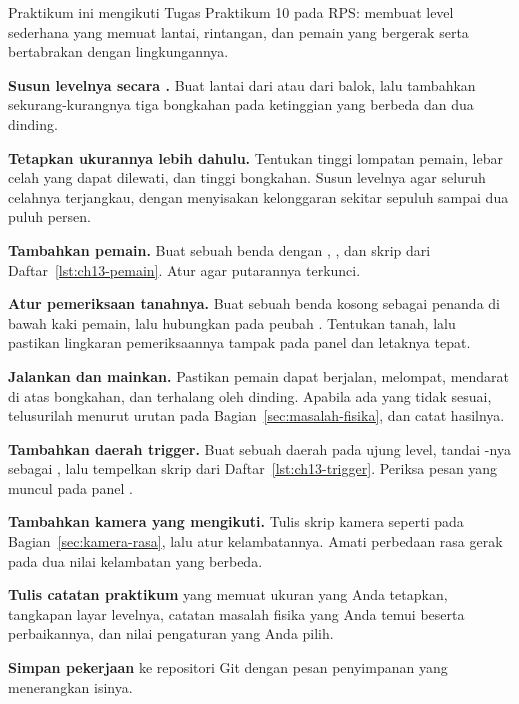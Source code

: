 \begin{praktikumbox}
Praktikum ini mengikuti Tugas Praktikum 10 pada RPS: membuat level sederhana
yang memuat lantai, rintangan, dan pemain yang bergerak serta bertabrakan
dengan lingkungannya.

\begin{langkah}
  \item \textbf{Susun levelnya secara .} Buat lantai dari
         atau dari balok, lalu tambahkan sekurang-kurangnya
        tiga bongkahan pada ketinggian yang berbeda dan dua dinding.

  \item \textbf{Tetapkan ukurannya lebih dahulu.} Tentukan tinggi lompatan
        pemain, lebar celah yang dapat dilewati, dan tinggi bongkahan. Susun
        levelnya agar seluruh celahnya terjangkau, dengan menyisakan kelonggaran
        sekitar sepuluh sampai dua puluh persen.

  \item \textbf{Tambahkan pemain.} Buat sebuah benda dengan
        , , dan skrip
         dari Daftar~\ref{lst:ch13-pemain}. Atur
         agar putarannya terkunci.

  \item \textbf{Atur pemeriksaan tanahnya.} Buat sebuah benda kosong sebagai
        penanda di bawah kaki pemain, lalu hubungkan pada peubah
        . Tentukan  tanah, lalu pastikan
        lingkaran pemeriksaannya tampak pada panel  dan letaknya
        tepat.

  \item \textbf{Jalankan dan mainkan.} Pastikan pemain dapat berjalan,
        melompat, mendarat di atas bongkahan, dan terhalang oleh dinding.
        Apabila ada yang tidak sesuai, telusurilah menurut urutan pada
        Bagian~\ref{sec:masalah-fisika}, dan catat hasilnya.

  \item \textbf{Tambahkan daerah trigger.} Buat sebuah daerah pada ujung level,
        tandai -nya sebagai , lalu
        tempelkan skrip  dari Daftar~\ref{lst:ch13-trigger}.
        Periksa pesan yang muncul pada panel .

  \item \textbf{Tambahkan kamera yang mengikuti.} Tulis skrip kamera seperti
        pada Bagian~\ref{sec:kamera-rasa}, lalu atur kelambatannya. Amati
        perbedaan rasa gerak pada dua nilai kelambatan yang berbeda.

  \item \textbf{Tulis catatan praktikum} yang memuat ukuran yang Anda tetapkan,
        tangkapan layar levelnya, catatan masalah fisika yang Anda temui beserta
        perbaikannya, dan nilai pengaturan yang Anda pilih.

  \item \textbf{Simpan pekerjaan} ke repositori Git dengan pesan penyimpanan
        yang menerangkan isinya.
\end{langkah}
\end{praktikumbox}


